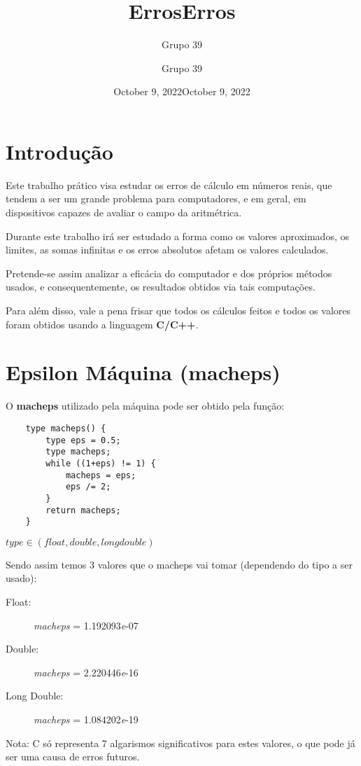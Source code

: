 \documentclass[12pt, letterpaper]{article}
\title{Erros}
\author{Grupo 39}
\date{October 9, 2022}
\title{Erros}
\author{Grupo 39}
\date{October 9, 2022}
\begin{document}
\maketitle

\section*{Introdução}

Este trabalho prático visa estudar os erros de cálculo em números reais, que tendem a ser um grande problema para computadores, e em geral, em dispositivos capazes de avaliar o campo da aritmétrica.

Durante este trabalho irá ser estudado a forma como os valores aproximados, os limites, as somas infinitas e os erros absolutos afetam os valores calculados. 

Pretende-se assim analizar a eficácia do computador e dos próprios métodos usados, e consequentemente, os resultados obtidos via tais computações.

Para além disso, vale a pena frisar que todos os cálculos feitos e todos os valores foram obtidos usando a linguagem \textbf{C/C++}. 

\section*{Epsilon Máquina (macheps)}
O \textbf{macheps} utilizado pela máquina pode ser obtido pela função:
\begin{verbatim}
    type macheps() {
        type eps = 0.5;
        type macheps;
        while ((1+eps) != 1) {
            macheps = eps;
            eps /= 2;
        }
        return macheps;
    }
\end{verbatim}

$type \in (float, double, long double)$

Sendo assim temos 3 valores que o macheps vai tomar (dependendo do tipo a ser usado):

\begin{description}
    \item[Float:]\textit{macheps} = 1.192093\textit{e}-07
    \item[Double:]\textit{macheps} = 2.220446\textit{e}-16
    \item[Long Double:]\textit{macheps} = 1.084202\textit{e}-19
\end{description}

\small Nota: C só representa 7 algarismos significativos para estes valores, o que pode já ser uma causa de erros futuros.
\end{document}
